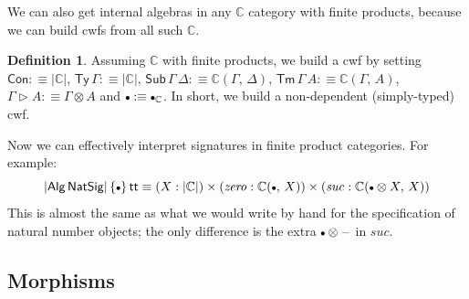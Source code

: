 \documentclass[12pt,a4paper,twoside,openany]{book}
\theoremstyle{remark}
\theoremstyle{definition}
\newtheorem{mydefinition}{Definition}
\theoremstyle{theorem}
\newcommand{\mi}[1]{\mathit{#1}}
\newcommand{\ms}[1]{\mathsf{#1}}
\newcommand{\mbb}[1]{\mathbb{#1}}
\newcommand{\Con}{\mathsf{Con}}
\newcommand{\Sub}{\mathsf{Sub}}
\newcommand{\Tm}{\mathsf{Tm}}
\newcommand{\Ty}{\mathsf{Ty}}
\renewcommand{\tt}{\mathsf{tt}}
\newcommand{\blank}{\mathord{\hspace{1pt}\text{--}\hspace{1pt}}}
\newcommand{\ext}{\triangleright}
\newcommand{\emptycon}{\scaleobj{.75}\bullet}
\newcommand{\Alg}{\ms{Alg}}
\newcommand{\mbbC}{\mbb{C}}
\newcommand{\defn}{:\equiv}
\begin{document}
We can also get internal algebras in any $\mbbC$ category with finite products,
because we can build cwfs from all such $\mbbC$.

\begin{mydefinition} Assuming $\mbbC$ with finite products, we build a cwf by setting
$\Con \defn |\mbbC|$, $\Ty\,\Gamma \defn |\mbbC|$, $\Sub\,\Gamma\,\Delta \defn \mbbC(\Gamma,\,\Delta)$, $\Tm\,\Gamma\,A \defn \mbbC(\Gamma,\,A)$, $\Gamma \ext A \defn \Gamma \otimes A$ and $\emptycon \defn \emptycon_{\mbbC}$. In short, we build a non-dependent (simply-typed) cwf.
\end{mydefinition}

Now we can effectively interpret signatures in finite product categories. For
example:
\[
|\Alg\,\ms{NatSig}|\,\{\emptycon\}\,\tt \equiv
(X : |\mbbC|) \times (\mi{zero} : \mbbC(\emptycon,\,X)) \times (\mi{suc} : \mbbC(\emptycon \otimes X,\,X))
\]
This is almost the same as what we would write by hand for the specification of
natural number objects; the only difference is the extra $\emptycon
\otimes\blank$ in $\mi{suc}$.

\subsection{Morphisms}
\end{document}
